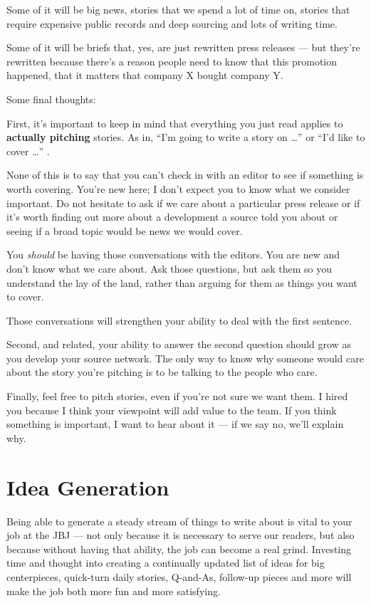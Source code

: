 \documentclass[
  12pt,
  american,
  letterpaperpaper,
  extrafontsizes,onecolumn,openright
  ]{memoir}
\begin{document}
Some of it will be big news, stories that we spend a lot of time on, stories that require expensive public records and deep sourcing and lots of writing time.

Some of it will be briefs that, yes, are just rewritten press releases --- but they're rewritten because there's a reason people need to know that this promotion happened, that it matters that company X bought company Y.

Some final thoughts:

First, it's important to keep in mind that everything you just read applies to \textbf{actually pitching} stories. As in, \enquote{I'm going to write a story on \ldots{}} or \enquote{I'd like to cover \ldots{}} .

None of this is to say that you can't check in with an editor to see if something is worth covering. You're new here; I don't expect you to know what we consider important. Do not hesitate to ask if we care about a particular press release or if it's worth finding out more about a development a source told you about or seeing if a broad topic would be news we would cover.

You \emph{should} be having those conversations with the editors. You are new and don't know what we care about.
Ask those questions, but ask them so you understand the lay of the land, rather than arguing for them as things you want to cover.

Those conversations will strengthen your ability to deal with the first sentence.

Second, and related, your ability to answer the second question should grow as you develop your source network. The only way to know why someone would care about the story you're pitching is to be talking to the people who care.

Finally, feel free to pitch stories, even if you're not sure we want them. I hired you because I think your viewpoint will add value to the team. If you think something is important, I want to hear about it --- if we say no, we'll explain why.

\hypertarget{idea-generation}{%
\chapter{Idea Generation}\label{idea-generation}}

Being able to generate a steady stream of things to write about is vital to your job at the JBJ --- not only because it is necessary to serve our readers, but also because without having that ability, the job can become a real grind. Investing time and thought into creating a continually updated list of ideas for big centerpieces, quick-turn daily stories, Q-and-As, follow-up pieces and more will make the job both more fun and more satisfying.
\end{document}
